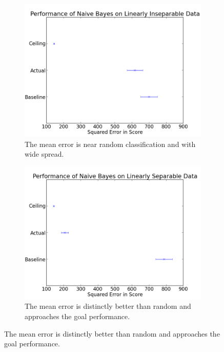 \documentclass[12pt,notitlepage,twoside]{scrreprt}
\begin{document}
\begin{figure}[h!]
  \begin{subfigure}[b]{0.49\textwidth}
    \centering
 \includegraphics[width=\linewidth]{figs/insep.png}
 \caption{The mean error is near random
 classification and with wide spread. \label{insep}}
\end{subfigure}
\begin{subfigure}[b]{0.49\textwidth}
  \centering
  \includegraphics[width=\linewidth]{figs/sep.png}
  \caption{The mean error is distinctly
  better than random and approaches the goal performance. \label{sep}}
\end{subfigure}
\end{figure}
\end{document}
